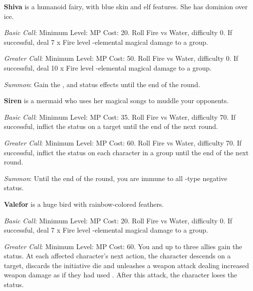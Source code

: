 \begin{multicols}{2}
	\textbf{Shiva} is a humanoid fairy, with blue skin and elf features. She has dominion over ice.
    
    \textit{Basic Call}: Minimum Level:  MP Cost: 20. Roll Fire vs Water, difficulty 0. If successful, deal 7 x Fire level -elemental magical damage to a group.
    
    \textit{Greater Call}: Minimum Level:  MP Cost: 50. Roll Fire vs Water, difficulty 0. If successful, deal 10 x Fire level -elemental magical damage to a group.
    
    \textit{Summon}: Gain the  ,   and   status effects until the end of the round.

    \ffcrystal[type=level,height=8pt]
    
    \textbf{Siren} is a mermaid who uses her magical songs to muddle your opponents.
    
    \textit{Basic Call}: Minimum Level:  MP Cost: 35. Roll Fire vs Water, difficulty 70. If successful, inflict the  status on a target until the end of the next round.
    
    \textit{Greater Call}: Minimum Level:  MP Cost: 60. Roll Fire vs Water, difficulty 70. If successful, inflict the  status on each character in a group until the end of the next round.
    
    \textit{Summon}: Until the end of the round, you are immune to all -type negative status.

    \ffcrystal[type=level,height=8pt]
    
    \textbf{Valefor} is a huge bird with rainbow-colored feathers.
    
    \textit{Basic Call}: Minimum Level:  MP Cost: 20. Roll Fire vs Water, difficulty 0. If successful, deal 7 x Fire level -elemental magical damage to a group.
    
    \textit{Greater Call}: Minimum Level:  MP Cost: 60. You and up to three allies gain the  status. At each affected character’s next action, the character descends on a target, discards the initiative die and unleashes a weapon attack dealing increased weapon damage as if they had used . After this attack, the character loses the  status.
    

\end{multicols}

